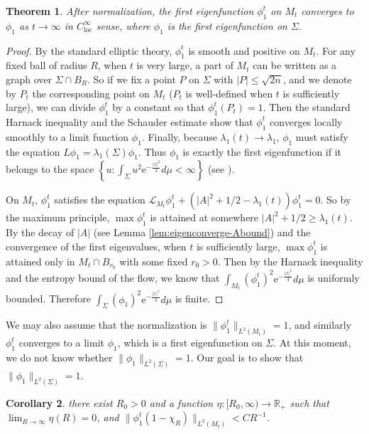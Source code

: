 \documentclass[12pt]{amsart}
\numberwithin{equation}{section}
\newtheorem{theorem}{Theorem}[section]
\newtheorem{corollary}[theorem]{Corollary}
\numberwithin{equation}{section}
\newcommand{\cL}{\mathcal{L}}
\newcommand{\R}{\mathbb{R}}
\DeclareMathOperator{\loc}{loc}
\begin{document}
	\begin{theorem}\label{thm:conv1steigenfun}
		After normalization, the first eigenfunction $\phi_1^t$ on $M_t$ converges to $\phi_1$ as $t\to\infty$ in $C_{\loc}^\infty$ sense, where $\phi_1$ is the first eigenfunction on $\Sigma$.
	\end{theorem}
	
	\begin{proof}
		By the standard elliptic theory, $\phi_1^t$ is smooth and positive on $M_t$. For any fixed ball of radius $R$, when $t$ is very large, a part of $M_t$ can be written as a graph over $\Sigma\cap B_R$. So if we fix a point $P$ on $\Sigma$ with $|P|\leq \sqrt{2n}$, and we denote by $P_t$ the corresponding point on $M_t$ ($P_t$ is well-defined when $t$ is sufficiently large), we can divide $\phi_1^t$ by a constant so that $\phi_1^t(P_t)=1$. Then the standard Harnack inequality and the Schauder estimate show that $\phi_1^t$ converges locally smoothly to a limit function $\phi_1$. Finally, because $\lambda_1(t)\to\lambda_1$, $\phi_1$ must satisfy the equation 
		$L\phi_1=\lambda_1(\Sigma)\phi_1.$
		Thus $\phi_1$ is exactly the first eigenfunction if it belongs to the space
		$\left\{u:\int_\Sigma u^2\mathrm{e}^{-\frac{|x|^2}{4}}d\mu<\infty\right\}$  (see \cite[Proposition 4.1]{BW}).
		
		
		On $M_t$, $\phi_1^t$ satisfies the equation
		$\cL_{M_t}\phi_1^t+(|A|^2+1/2-\lambda_1(t))\phi_1^t=0.$
		So by the maximum principle, $\max\phi_1^t$ is attained at somewhere $|A|^2+1/2\geq \lambda_1(t)$. By the decay of $|A|$ (see Lemma \ref{lem:eigenconverge-Abound}) and the convergence of the first eigenvalues, when $t$ is sufficiently large, $\max \phi_1^t$ is attained only in $M_t\cap B_{r_0}$ with some fixed $r_0>0$. Then by the Harnack inequality and the entropy bound of the flow, we know that $\int_{M_t} (\phi_1^t)^2\mathrm{e}^{-\frac{|x|^2}{4}}d\mu$ is uniformly bounded. Therefore $\int_\Sigma (\phi_1)^2\mathrm{e}^{-\frac{|x|^2}{4}}d\mu$ is finite.
	\end{proof}
	
	We may also assume that the normalization is $\|\phi_1^t\|_{L^2(M_t)}=1$, and similarly $\phi_1^t$ converges to a limit $\phi_1$, which is a first eigenfunction on $\Sigma$. At this moment, we do not know whether $\|\phi_1\|_{L^2(\Sigma)}=1$. Our goal is to show that $\|\phi_1\|_{L^2(\Sigma)}=1$.
	
	
	
	\begin{corollary}\label{cor:1stcutsmall}
		there exist $R_0>0$ and a function $\eta:[R_0,\infty)\to \R_+$ such that $\lim_{R\to\infty}\eta(R)=0$, and $\|\phi_1^t(1-\chi_R)\|_{L^2(M_t)}<C R^{-1}$.   
	\end{corollary}
	
\end{document}
